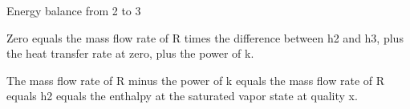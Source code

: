 Energy balance from 2 to 3

Zero equals the mass flow rate of R times the difference between h2 and h3, plus the heat transfer rate at zero, plus the power of k.

The mass flow rate of R minus the power of k equals the mass flow rate of R equals h2 equals the enthalpy at the saturated vapor state at quality x.